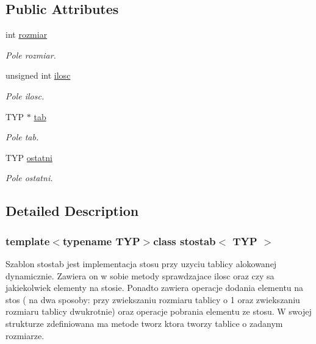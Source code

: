 \subsection*{Public Attributes}
\begin{DoxyCompactItemize}
\item 
int \hyperlink{classstostab_a5b43739b2e4cc4ac4f60e6b23687c08a}{rozmiar}
\begin{DoxyCompactList}\small\item\em Pole rozmiar. \end{DoxyCompactList}\item 
unsigned int \hyperlink{classstostab_a438aa2525088ae1f5487f0552a4d3300}{ilosc}
\begin{DoxyCompactList}\small\item\em Pole ilosc. \end{DoxyCompactList}\item 
T\-Y\-P $\ast$ \hyperlink{classstostab_ad0b2249981a482f6217f3f4c8f1aab55}{tab}
\begin{DoxyCompactList}\small\item\em Pole tab. \end{DoxyCompactList}\item 
T\-Y\-P \hyperlink{classstostab_a52a63ea67f972826bfec6709d69c0e8d}{ostatni}
\begin{DoxyCompactList}\small\item\em Pole ostatni. \end{DoxyCompactList}\end{DoxyCompactItemize}


\subsection{Detailed Description}
\subsubsection*{template$<$typename T\-Y\-P$>$class stostab$<$ T\-Y\-P $>$}

Szablon stostab jest implementacja stosu przy uzyciu tablicy alokowanej dynamicznie. Zawiera on w sobie metody sprawdzajace ilosc oraz czy sa jakiekolwiek elementy na stosie. Ponadto zawiera operacje dodania elementu na stos ( na dwa sposoby\-: przy zwiekszaniu rozmiaru tablicy o 1 oraz zwiekszaniu rozmiaru tablicy dwukrotnie) oraz operacje pobrania elementu ze stosu. W swojej strukturze zdefiniowana ma metode tworz ktora tworzy tablice o zadanym rozmiarze. 

